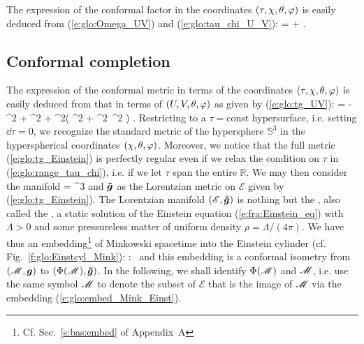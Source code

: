 The expression of the conformal factor in the
coordinates $(\tau,\chi,\theta,\varphi)$ is easily deduced from
(\ref{e:glo:Omega_UV}) and
(\ref{e:glo:tau_chi_U_V}):
\be \label{e:glo:Omega_tau_chi}
    \Omega = \cos\tau + \cos\chi .
\ee


\subsection{Conformal completion} \label{s:glo:conf_complet_Mink}

The expression of the conformal metric in terms of the coordinates
$(\tau,\chi,\theta,\varphi)$ is easily deduced from that in terms of
$(U,V,\theta,\varphi)$ as given by (\ref{e:glo:tg_UV}):
\be \label{e:glo:tg_Einstein}
     =  - \dd\tau^2
        + \dd \chi^2
        + \sin^2\chi \left(  \dd\th^2 + \sin^2\th \, \dd\ph^2 \right) .
\ee
Restricting to a $\tau = \mathrm{const}$ hypersurface, i.e. setting $\dd\tau=0$,
we recognize the standard metric of the hypersphere
$\mathbb{S}^3$ in the hyperspherical coordinates $(\chi,\theta,\varphi)$.
Moreover, we notice that the full metric (\ref{e:glo:tg_Einstein})
is perfectly regular even if we relax
the condition on $\tau$ in (\ref{e:glo:range_tau_chi}), i.e. if we
let $\tau$ span the
entire $\mathbb{R}$. We may then consider the manifold
\be
     = \times {}^3
\ee
and $\bm{\tilde{g}}$ as the Lorentzian metric on $\mathscr{E}$ given by
(\ref{e:glo:tg_Einstein}).
The Lorentzian manifold
$(\mathscr{E},\bm{\tilde{g}})$ is nothing but the
, also called the ,
a static solution of the Einstein equation (\ref{e:fra:Einstein_eq})
with $\Lambda > 0$ and some pressureless matter of uniform density
$\rho = \Lambda/(4\pi)$.
We have thus an embedding\footnote{Cf. Sec.~\ref{s:bas:embed} of Appendix~A} of Minkowski spacetime into the Einstein cylinder (cf. Fig.~\ref{f:glo:Einstcyl_Mink}):
\be \label{e:glo:embed_Mink_Einst}
     \Phi:\ \M \longrightarrow {}
\ee
and this embedding is a conformal isometry from
$(\mathscr{M},\bm{g})$ to $(\Phi(\mathscr{M}),\bm{\tilde{g}})$.
In the following, we shall identify $\Phi(\mathscr{M})$ and $\mathscr{M}$, i.e. use the same
symbol $\mathscr{M}$ to denote the subset of $\mathscr{E}$ that is the image of $\mathscr{M}$ via the
embedding (\ref{e:glo:embed_Mink_Einst}).

